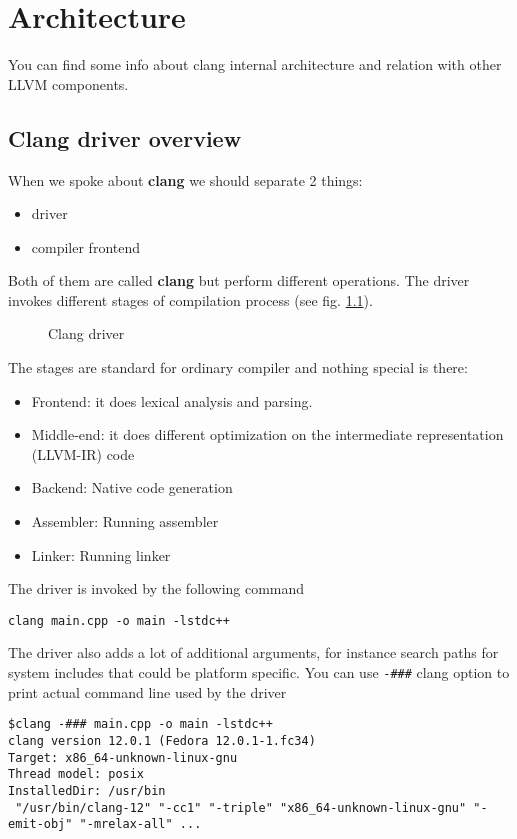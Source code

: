 \chapter{Architecture}

You can find some info about clang internal architecture and relation with other
LLVM components.

\section{Clang driver overview}

When we spoke about \textbf{clang} we should separate 2 things:
\begin{itemize}
\item driver
\item compiler frontend 
\end{itemize}
Both of them are called \textbf{clang} but perform different
operations. The driver invokes different stages of compilation process
(see fig. \ref{fig:clang_driver}). 
\begin{figure}
\begin{center}
\end{center}
  \caption{Clang driver}
  \label{fig:clang_driver}
\end{figure}
The stages are standard for ordinary compiler and nothing special is
there:
\begin{itemize}
\item Frontend: it does lexical analysis and parsing.
\item Middle-end: it does different optimization on the intermediate
  representation (LLVM-IR) code
\item Backend: Native code generation
\item Assembler: Running assembler
\item Linker: Running linker
\end{itemize}

The driver is invoked by the following command
\begin{verbatim}
clang main.cpp -o main -lstdc++
\end{verbatim}
The driver also adds a lot of additional arguments, for instance
search paths for system includes that could be platform specific.
You can use \texttt{-###} clang option to print actual
command line used by the driver
\begin{verbatim}
$clang -### main.cpp -o main -lstdc++
clang version 12.0.1 (Fedora 12.0.1-1.fc34)
Target: x86_64-unknown-linux-gnu
Thread model: posix
InstalledDir: /usr/bin
 "/usr/bin/clang-12" "-cc1" "-triple" "x86_64-unknown-linux-gnu" "-emit-obj" "-mrelax-all" ...
\end{verbatim}

